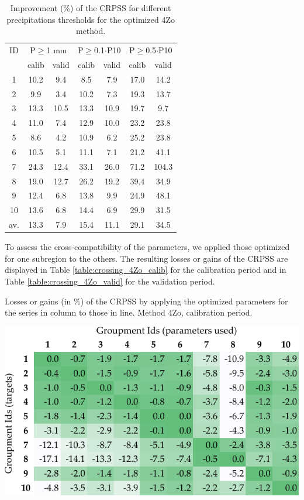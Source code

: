 \documentclass[5p]{elsarticle}
\begin{document}
\begin{table}[htbp]
	\caption{Improvement (\%) of the CRPSS for different precipitations thresholds for the optimized 4Zo method.}
	\footnotesize
	\begin{center}
		\begin{tabular}{ccccccc}
			\hline 
			ID & \multicolumn{2}{c}{P\(\geq\)1 mm} & \multicolumn{2}{c}{P\(\geq\)0.1\(\cdot\)P10} & \multicolumn{2}{c}{P\(\geq\)0.5\(\cdot\)P10} \\ 
			& calib & valid & calib & valid & calib & valid \\ 
			\hline 
			1 & 10.2 & 9.4 & 8.5 & 7.9 & 17.0 & 14.2 \\ 
			2 & 9.9 & 3.4 & 10.2 & 7.3 & 19.3 & 13.7 \\ 
			3 & 13.3 & 10.5 & 13.3 & 10.9 & 19.7 & 9.7 \\ 
			4 & 11.0 & 7.4 & 12.9 & 10.0 & 23.2 & 23.8 \\ 
			5 & 8.6 & 4.2 & 10.9 & 6.2 & 25.2 & 23.8 \\ 
			6 & 10.5 & 5.1 & 11.1 & 7.1 & 21.2 & 41.1 \\ 
			7 & 24.3 & 12.4 & 33.1 & 26.0 & 71.2 & 104.3 \\ 
			8 & 19.0 & 12.7 & 26.2 & 19.2 & 39.4 & 34.9 \\ 
			9 & 12.4 & 6.8 & 13.8 & 9.9 & 24.9 & 48.1 \\ 
			10 & 13.6 & 6.8 & 14.4 & 6.9 & 29.9 & 31.5 \\ 
			\hline 
			av. & 13.3 & 7.9 & 15.4 & 11.1 & 29.1 & 34.5 \\ 
			\hline 
		\end{tabular} 
	\end{center}
	\label{table:scores_thresholds_4Zo}
\end{table}

To assess the cross-compatibility of the parameters, we applied those optimized for one subregion to the others. The resulting losses or gains of the CRPSS are displayed in Table \ref{table:crossing_4Zo_calib} for the calibration period and in Table \ref{table:crossing_4Zo_valid} for the validation period.

\begin{table}[htbp]
	\caption{Losses or gains (in \%) of the CRPSS by applying the optimized parameters for the series in column to those in line. Method 4Zo, calibration period.}
	\centerline{\includegraphics[width=\linewidth]{figures/table_crossing_z4_calib.pdf}}
	\label{table:crossing_4Zo_calib}
\end{table}
\end{document}
